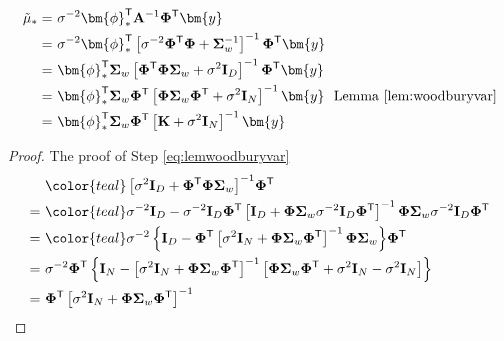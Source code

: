 \begin{align}
    \Tilde{{\mu}}_*
    =&~ \sigma^{-2}\bm{\phi}_*^\mathsf{T}\mathbf{A}^{-1}\mathbf{\Phi}^\mathsf{T}\bm{y} \\
    =&~ \sigma^{-2}\bm{\phi}_*^\mathsf{T}\left[
        \sigma^{-2}\mathbf{\Phi}^\mathsf{T}\mathbf{\Phi} + \mathbf{\Sigma}_w^{-1}
    \right]^{-1}\mathbf{\Phi}^\mathsf{T}\bm{y} \\
    =&~ \bm{\phi}_*^\mathsf{T}\mathbf{\Sigma}_w\left[
        \mathbf{\Phi}^\mathsf{T}\mathbf{\Phi}\mathbf{\Sigma}_w + \sigma^{2}\mathbf{I}_D
    \right]^{-1}\mathbf{\Phi}^\mathsf{T}\bm{y} \\
    =&~ \bm{\phi}_*^\mathsf{T}\mathbf{\Sigma}_w\mathbf{\Phi}^\mathsf{T}\left[
        \mathbf{\Phi}\mathbf{\Sigma}_w\mathbf{\Phi}^\mathsf{T} + \sigma^{2}\mathbf{I}_N
    \right]^{-1}\bm{y}~~\text{Lemma \ref{lem:woodburyvar}} \label{eq:lemwoodburyvar}\\
    =&~ \bm{\phi}_*^\mathsf{T}\mathbf{\Sigma}_w\mathbf{\Phi}^\mathsf{T}\left[
        \mathbf{K} + \sigma^2\mathbf{I}_N
    \right]^{-1}\bm{y}
\end{align}
\begin{proof}
    The proof of Step \ref{eq:lemwoodburyvar}
    \begin{align}
        &~{\color{teal}\left[
            \sigma^{2}\mathbf{I}_D + \mathbf{\Phi}^\mathsf{T}\mathbf{\Phi}\mathbf{\Sigma}_w
        \right]^{-1}}\mathbf{\Phi}^\mathsf{T} \\
        =&~ {\color{teal}\sigma^{-2}\mathbf{I}_D - \sigma^{-2}\mathbf{I}_D\mathbf{\Phi}^\mathsf{T}\left[
            \mathbf{I}_D + \mathbf{\Phi}\mathbf{\Sigma}_w\sigma^{-2}\mathbf{I}_D\mathbf{\Phi}^\mathsf{T}
        \right]^{-1}\mathbf{\Phi}\mathbf{\Sigma}_w\sigma^{-2}\mathbf{I}_D} \mathbf{\Phi}^\mathsf{T}\\
        =&~ {\color{teal}\sigma^{-2}\left\{
            \mathbf{I}_D - \mathbf{\Phi}^\mathsf{T}\left[
                \sigma^2\mathbf{I}_N + \mathbf{\Phi}\mathbf{\Sigma}_w\mathbf{\Phi}^\mathsf{T}
            \right]^{-1}\mathbf{\Phi}\mathbf{\Sigma}_w
        \right\}}\mathbf{\Phi}^\mathsf{T}\\
        =&~ \sigma^{-2}\mathbf{\Phi}^\mathsf{T}\left\{
            \mathbf{I}_N - \left[
                \sigma^2\mathbf{I}_N + \mathbf{\Phi}\mathbf{\Sigma}_w\mathbf{\Phi}^\mathsf{T}
            \right]^{-1}\left[
                \mathbf{\Phi}\mathbf{\Sigma}_w\mathbf{\Phi}^\mathsf{T} + \sigma^2\mathbf{I}_N - \sigma^2\mathbf{I}_N
            \right]
        \right\}\\
        =&~ \mathbf{\Phi}^\mathsf{T}\left[
            \sigma^2\mathbf{I}_N + \mathbf{\Phi}\mathbf{\Sigma}_w\mathbf{\Phi}^\mathsf{T}
        \right]^{-1}
    \end{align}
\end{proof}



